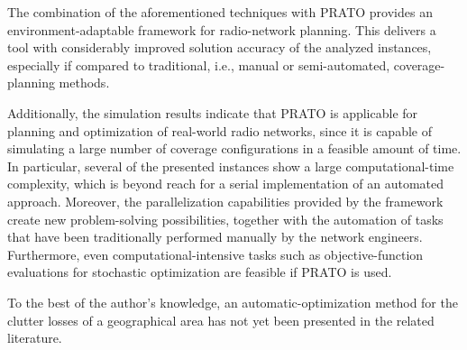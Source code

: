 The combination of the aforementioned techniques with PRATO provides
an environment-adaptable framework for radio-network planning. This
delivers a tool with considerably improved solution accuracy of the
analyzed instances, especially if compared to traditional, i.e., manual
or semi-automated, coverage-planning methods.

Additionally, the simulation results indicate that PRATO is applicable
for planning and optimization of real-world radio networks, since
it is capable of simulating a large number of coverage configurations
in a feasible amount of time. In particular, several of the presented
instances show a large computational-time complexity, which is beyond
reach for a serial implementation of an automated approach. Moreover,
the parallelization capabilities provided by the framework create
new problem-solving possibilities, together with the automation of
tasks that have been traditionally performed manually by the network
engineers. Furthermore, even computational-intensive tasks such as
objective-function evaluations for stochastic optimization are feasible
if PRATO is used.

To the best of the author's knowledge, an automatic-optimization method
for the clutter losses of a geographical area has not yet been presented
in the related literature.
